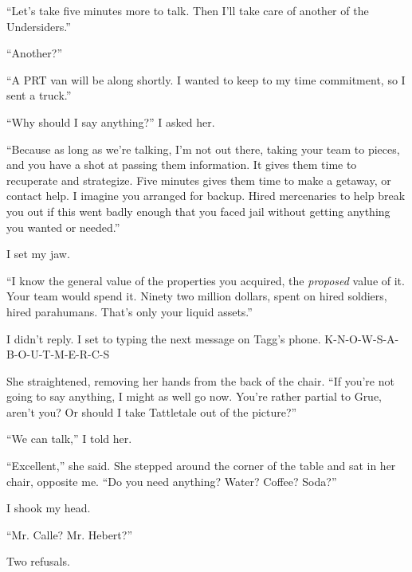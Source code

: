 ``Let's take five minutes more to talk.  Then I'll take care of another of the Undersiders.''



``Another?''



``A PRT van will be along shortly.  I wanted to keep to my time commitment, so I sent a truck.''



``Why should I say anything?'' I asked her.



``Because as long as we're talking, I'm not out there, taking your team to pieces, and you have a shot at passing them information.  It gives them time to recuperate and strategize.  Five minutes gives them time to make a getaway, or contact help.  I imagine you arranged for backup.  Hired mercenaries to help break you out if this went badly enough that you faced jail without getting anything you wanted or needed.''



I set my jaw.



``I know the general value of the properties you acquired, the \emph{proposed} value of it.  Your team would spend it.  Ninety two million dollars, spent on hired soldiers, hired parahumans.  That's only your liquid assets.''



I didn't reply.  I set to typing the next message on Tagg's phone.  K-N-O-W-S-A-B-O-U-T-M-E-R-C-S



She straightened, removing her hands from the back of the chair.  ``If you're not going to say anything, I might as well go now.  You're rather partial to Grue, aren't you?  Or should I take Tattletale out of the picture?''



``We can talk,'' I told her.



``Excellent,'' she said.  She stepped around the corner of the table and sat in her chair, opposite me.  ``Do you need anything?  Water?  Coffee?  Soda?''



I shook my head.



``Mr. Calle?  Mr. Hebert?''



Two refusals.




